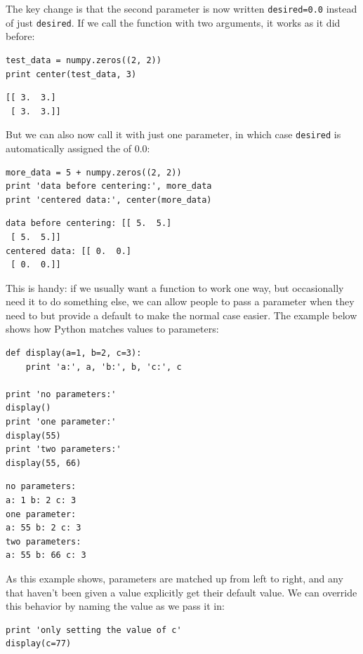 \documentclass{book}
\begin{document}
The key change is that the second parameter is now written
\texttt{desired=0.0} instead of just \texttt{desired}. If we call the
function with two arguments, it works as it did before:

\begin{verbatim}
test_data = numpy.zeros((2, 2))
print center(test_data, 3)
\end{verbatim}

\begin{verbatim}
[[ 3.  3.]
 [ 3.  3.]]
\end{verbatim}

But we can also now call it with just one parameter, in which case
\texttt{desired} is automatically assigned the
 of 0.0:

\begin{verbatim}
more_data = 5 + numpy.zeros((2, 2))
print 'data before centering:', more_data
print 'centered data:', center(more_data)
\end{verbatim}

\begin{verbatim}
data before centering: [[ 5.  5.]
 [ 5.  5.]]
centered data: [[ 0.  0.]
 [ 0.  0.]]
\end{verbatim}

This is handy: if we usually want a function to work one way, but
occasionally need it to do something else, we can allow people to pass a
parameter when they need to but provide a default to make the normal
case easier. The example below shows how Python matches values to
parameters:

\begin{verbatim}
def display(a=1, b=2, c=3):
    print 'a:', a, 'b:', b, 'c:', c

print 'no parameters:'
display()
print 'one parameter:'
display(55)
print 'two parameters:'
display(55, 66)
\end{verbatim}

\begin{verbatim}
no parameters:
a: 1 b: 2 c: 3
one parameter:
a: 55 b: 2 c: 3
two parameters:
a: 55 b: 66 c: 3
\end{verbatim}

As this example shows, parameters are matched up from left to right, and
any that haven't been given a value explicitly get their default value.
We can override this behavior by naming the value as we pass it in:

\begin{verbatim}
print 'only setting the value of c'
display(c=77)
\end{verbatim}
\end{document}
